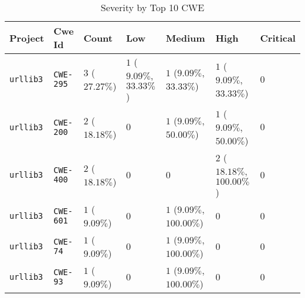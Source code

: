\begin{table}
\caption{Severity by Top 10 CWE}
\label{tab:cwe-distribution}
\begin{tabular}{lllllll}
\toprule
Project & Cwe Id & Count & Low & Medium & High & Critical \\
\midrule
\texttt{urllib3} & \texttt{CWE-295} & $3$ ($27.27\%$) & $1$ ($9.09\%$, $33.33\%$) & $1$ ($9.09\%$, $33.33\%$) & $1$ ($9.09\%$, $33.33\%$) & $0$ \\
\texttt{urllib3} & \texttt{CWE-200} & $2$ ($18.18\%$) & $0$ & $1$ ($9.09\%$, $50.00\%$) & $1$ ($9.09\%$, $50.00\%$) & $0$ \\
\texttt{urllib3} & \texttt{CWE-400} & $2$ ($18.18\%$) & $0$ & $0$ & $2$ ($18.18\%$, $100.00\%$) & $0$ \\
\texttt{urllib3} & \texttt{CWE-601} & $1$ ($9.09\%$) & $0$ & $1$ ($9.09\%$, $100.00\%$) & $0$ & $0$ \\
\texttt{urllib3} & \texttt{CWE-74} & $1$ ($9.09\%$) & $0$ & $1$ ($9.09\%$, $100.00\%$) & $0$ & $0$ \\
\texttt{urllib3} & \texttt{CWE-93} & $1$ ($9.09\%$) & $0$ & $1$ ($9.09\%$, $100.00\%$) & $0$ & $0$ \\
\bottomrule
\end{tabular}
\end{table}
